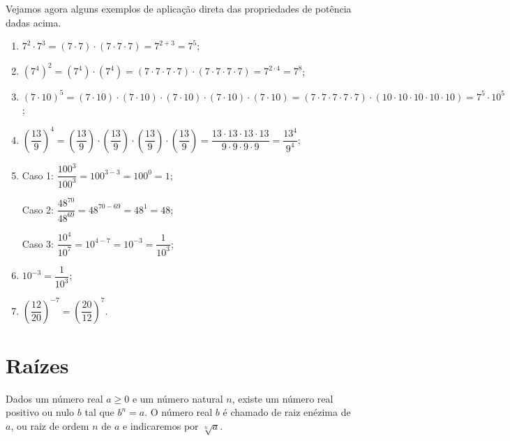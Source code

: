 \vskip0.3cm

 \begin{exem} Vejamos agora alguns exemplos de aplicação direta das propriedades de potência dadas acima.
  \begin{enumerate}[P1)]
   \item $7^2 \cdot 7^3= (7 \cdot 7) \cdot (7 \cdot 7 \cdot 7)= 7^{2+3}= 7^5 $;
   \item $(7^4)^2= (7^4) \cdot (7^4)= (7 \cdot 7 \cdot 7 \cdot 7) \cdot (7 \cdot 7 \cdot 7 \cdot 7)= 7^{2 \cdot 4}= 7^8$;
   \item $(7 \cdot 10)^5= (7 \cdot 10) \cdot (7 \cdot 10) \cdot (7 \cdot 10) \cdot (7 \cdot 10) \cdot (7 \cdot 10)= (7 \cdot 7 \cdot 7 \cdot 7 \cdot 7) \cdot (10 \cdot 10 \cdot 10 \cdot 10 \cdot 10)= 7^5 \cdot 10^5$;
   \item $\left(\dfrac{13}{9}\right)^4= \left(\dfrac{13}{9}\right) \cdot \left(\dfrac{13}{9}\right) \cdot \left(\dfrac{13}{9}\right) \cdot \left(\dfrac{13}{9}\right)= \dfrac{13 \cdot 13 \cdot 13 \cdot 13}{9 \cdot 9 \cdot 9 \cdot 9}= \dfrac{13^4}{9^4}$;
   \item Caso 1: $\dfrac{100^3}{100^3}= 100^{3-3}= 100^0= 1$;

   Caso 2: $\dfrac{48^{70}}{48^{69}}= 48^{70-69}= 48^{1}= 48$;

   Caso 3: $\dfrac{10^4}{10^7}= 10^{4-7}= 10^{-3} =\dfrac{1}{10^{3}}$;

   \item $10^{-3}= \dfrac{1}{10^3}$;
   \item $\left(\dfrac{12}{20}\right)^{-7}=\left(\dfrac{20}{12}\right)^{7}$.

  \end{enumerate}

 \end{exem}


 \section{Raízes}

 \vskip0.3cm

 \colorbox{azul}{
 \begin{minipage}{0.9\linewidth}
 \begin{center}
  Dados um número real $a \geq 0$ e um número natural $n$, existe um número real positivo ou nulo $b$ tal que $b^n= a$. O número real $b$ é chamado de raiz enézima de $a$, ou raiz de ordem $n$ de $a$ e indicaremos por $\sqrt[n]{a}$.
 \end{center}
 \end{minipage}}

